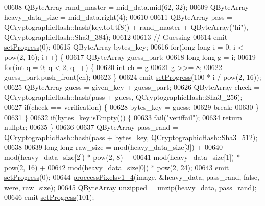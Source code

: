 \begin{DoxyCode}
00608     QByteArray rand\_master = mid\_data.mid(62, 32);
00609     QByteArray heavy\_data\_size = mid\_data.right(4);
00610 
00611     QByteArray pass = QCryptographicHash::hash(key.toUtf8() + rand\_master + QByteArray(\textcolor{stringliteral}{"hi"}), 
      QCryptographicHash::Sha3\_384);
00612 
00613     \textcolor{comment}{// Guessing}
00614     emit \hyperlink{class_model_p_c_afdcd80f0ed5062e145a71f09b0897547}{setProgress}(0);
00615     QByteArray bytes\_key;
00616     \textcolor{keywordflow}{for}(\textcolor{keywordtype}{long} \textcolor{keywordtype}{long} i = 0; i < pow(2, 16); i++) \{
00617         QByteArray guess\_part;
00618         \textcolor{keywordtype}{long} \textcolor{keywordtype}{long} g = i;
00619         \textcolor{keywordflow}{for}(\textcolor{keywordtype}{int} q = 0; q < 2; q++) \{
00620                 \textcolor{keywordtype}{int} ch = g %
00621                 g >>= 8;
00622                 guess\_part.push\_front(ch);
00623             \}
00624         emit \hyperlink{class_model_p_c_afdcd80f0ed5062e145a71f09b0897547}{setProgress}(100 * i / pow(2, 16));
00625         QByteArray guess = given\_key + guess\_part;
00626         QByteArray check = QCryptographicHash::hash(pass + guess, QCryptographicHash::Sha3\_256);
00627         \textcolor{keywordflow}{if}(check == verification) \{
00628             bytes\_key = guess;
00629             \textcolor{keywordflow}{break};
00630         \}
00631     \}
00632     \textcolor{keywordflow}{if}(bytes\_key.isEmpty()) \{
00633         \hyperlink{class_model_p_c_a47464b59b7e37fcee25e55475708aabd}{fail}(\textcolor{stringliteral}{"veriffail"});
00634         \textcolor{keywordflow}{return} \textcolor{keyword}{nullptr};
00635     \}
00636 
00637     QByteArray pass\_rand = QCryptographicHash::hash(pass + bytes\_key, QCryptographicHash::Sha3\_512);
00638 
00639     \textcolor{keywordtype}{long} \textcolor{keywordtype}{long} raw\_size = mod(heavy\_data\_size[3]) +
00640             mod(heavy\_data\_size[2]) * pow(2, 8) +
00641             mod(heavy\_data\_size[1]) * pow(2, 16) +
00642             mod(heavy\_data\_size[0]) * pow(2, 24);
00643     emit \hyperlink{class_model_p_c_afdcd80f0ed5062e145a71f09b0897547}{setProgress}(0);
00644     \hyperlink{class_model_p_c_a5cdb4d1d61ff62ee9d45b496a7dbf1fb}{proccessPixelsv1\_4}(image, &heavy\_data, pass\_rand, \textcolor{keyword}{false}, were, raw\_size);
00645     QByteArray unzipped = \hyperlink{class_model_p_c_a6da88f166785a49f73b22c169f956fd0}{unzip}(heavy\_data, pass\_rand);
00646     emit \hyperlink{class_model_p_c_afdcd80f0ed5062e145a71f09b0897547}{setProgress}(101);

\end{DoxyCode}
